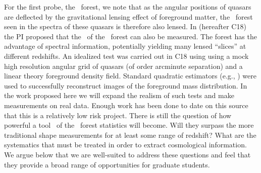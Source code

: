 
For the first probe, the \lya\ forest, we note that as the angular 
positions of quasars are deflected by the 
gravitational lensing effect of foreground matter, the \lya\ forest 
seen in the spectra of these quasars is 
therefore also lensed.
In \cite{croft17} (hereafter C18)
 the PI proposed that the 
\atf\ of the \lya\ forest
can also be measured.
The forest has the advantage of spectral information,
potentially yielding many lensed ``slices'' at different redshifts.
An idealized test was carried out in C18 using
using a mock  high resolution angular grid of quasars (of order arcminute separation) and a linear theory foreground density
field. Standard quadratic estimators (e.g., \cite{okamoto})  
were used to successfully  reconstruct images of the foreground mass 
distribution. In the work proposed here we will expand the realism
of such tests and make measurements on real data. Enough work has been done to date on this source that this is a relatively low risk
project. There is still the question of how powerful a tool \atf\ of the \lya\ forest statistics will become. Will they surpass the more traditional shape measurements for at least some range of redshift? What are the systematics that must be treated in order to extract cosmological information. We argue below that we are well-suited to address these questions and feel that they provide a broad range of opportunities for graduate students.

